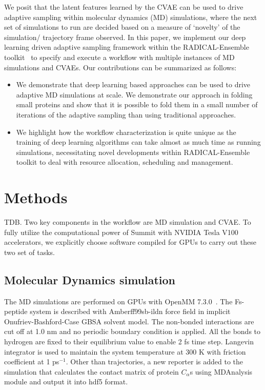 \documentclass[conference,final]{IEEEtran}
\begin{document}
We posit that the latent features learned by the CVAE can be used to drive adaptive sampling within molecular dynamics (MD) simulations, where the next set of simulations to run are decided based on a measure of ‘novelty’ of the simulation/ trajectory frame observed. In this paper, we implement our deep learning driven adaptive sampling framework within the RADICAL-Ensemble toolkit~\cite{balasubramanian2018harnessing} to specify and execute a workflow with multiple instances of MD simulations and CVAEs. Our contributions can be summarized as follows: 
\begin{itemize}
\item We demonstrate that deep learning based approaches can be used to drive adaptive MD simulations at scale. We demonstrate our approach in folding small proteins and show that it is possible to fold them in a small number of iterations of the adaptive sampling than using traditional approaches. 
\item We highlight how the workflow characterization is quite unique as the training of deep learning algorithms can take almost as much time as running simulations, necessitating novel developments within RADICAL-Ensemble toolkit to deal with resource allocation, scheduling and management. 
\end{itemize}


\section{Methods} 

TDB\@. Two key components in the workflow are MD simulation and CVAE. 
To fully utilize the computational power of Summit with NVIDIA Tesla V100 
accelerators, we explicitly choose software compiled for GPUs to carry out 
these two set of tasks. 


\subsection{Molecular Dynamics simulation}

The MD simulations are performed on GPUs with OpenMM
7.3.0~\cite{eastman2017openmm}. The Fs-peptide system is described with 
Amberff99sb-ildn force field in implicit Onufriev-Bashford-Case GBSA solvent 
model. The non-bonded 
interactions are cut off at 1.0 nm and no periodic boundary condition is
applied. All the bonds to hydrogen are fixed to their equilibrium value to
enable 2 fs time step. Langevin integrator is used to maintain the system
temperature at 300 K with friction coefficient at 1 ps$^{-1}$. Other than
trajectories, a new reporter is added to the simulation that calculates the 
contact matrix of protein $C_{\alpha}$s using 
MDAnalysis~\cite{michaud2011mdanalysis,gowers2016mdanalysis} 
module and output it into hdf5 format. 
\end{document}
